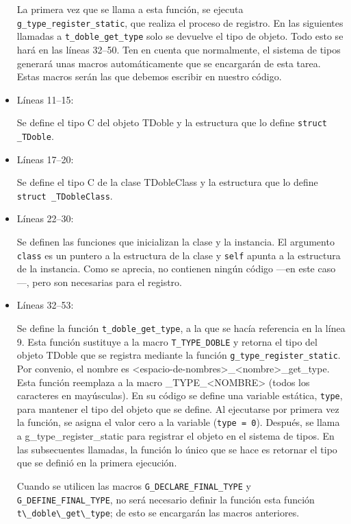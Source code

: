\begin{itemize}
  La primera vez que se llama a esta función, se ejecuta \texttt{g\_type\_register\_static}, que realiza el
  proceso de registro. En las siguientes llamadas a \texttt{t\_doble\_get\_type} solo se devuelve el tipo de objeto.
  Todo esto se hará en las líneas 32--50.
  Ten en cuenta que normalmente, el sistema de tipos generará unas macros automáticamente que se encargarán
  de esta tarea. Estas macros serán las que debemos escribir en nuestro código.
\item Líneas 11--15:\par
  Se define el tipo C del objeto \textsf{TDoble} y la estructura que lo define \texttt{struct \_TDoble}.
\item Líneas 17--20:\par
  Se define el tipo C de la clase \textsf{TDobleClass} y la estructura que lo define \texttt{struct \_TDobleClass}.
\item Líneas 22--30:\par
  Se definen las funciones que inicializan la clase y la instancia. El argumento \texttt{class} es un puntero a
  la estructura de la clase y \texttt{self} apunta a la estructura de la instancia.
  Como se aprecia, no contienen ningún código ---en este caso---, pero son necesarias para el registro.
\item Líneas 32--53:\par
  Se define la función \texttt{t\_doble\_get\_type}, a la que se hacía referencia en la línea 9.
  Esta función sustituye a la macro \texttt{T\_TYPE\_DOBLE} y retorna el tipo del objeto \textsf{TDoble}
  que se registra mediante la función \texttt{g\_type\_register\_static}.
  Por convenio, el nombre es \textsf{<espacio-de-nombres>\_<nombre>\_get\_type}. Esta función reemplaza
  a la macro \textsf{\_TYPE\_<NOMBRE>} (todos los caracteres en mayúsculas).
  En su código se define una variable estática, \texttt{type}, para mantener el tipo del objeto que se define.
  Al ejecutarse por primera vez la función, se asigna el valor cero a la variable (\texttt{type = 0}).
  Después, se llama a g\_type\_register\_static para registrar el objeto en el sistema de tipos. En las subsecuentes
  llamadas, la función lo único que se hace es retornar el tipo que se definió en la primera ejecución.\par
  Cuando se utilicen las macros \texttt{G\_DECLARE\_FINAL\_TYPE} y \texttt{G\_DEFINE\_FINAL\_TYPE}, no será
  necesario definir la función esta función \passthrough{\lstinline!t\_doble\_get\_type!}; de esto se encargarán las macros anteriores.

\end{itemize}
